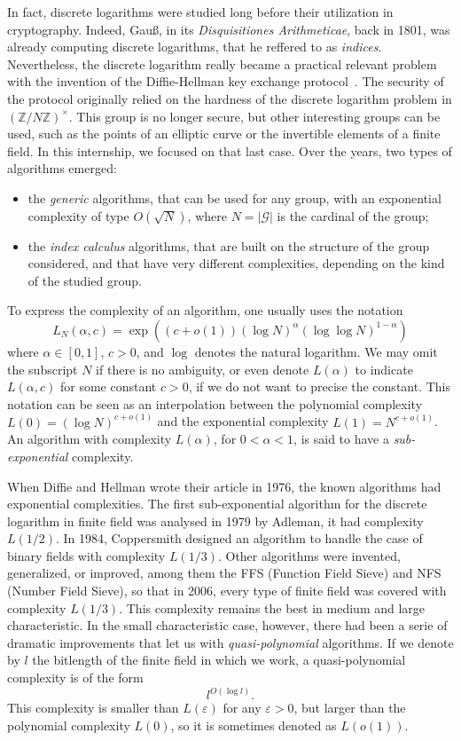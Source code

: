 \documentclass[a4paper,11pt]{article}
\theoremstyle{break}
\theoremstyle{sc}
\theoremstyle{definition}
\theoremstyle{remark}
\begin{document}
In fact, discrete
logarithms were studied long before their utilization in cryptography. Indeed,
Gauß, in its \emph{Disquisitiones Arithmeticae}, back in 1801, was already
computing discrete logarithms, that he reffered to as \emph{indices}.
Nevertheless, the discrete logarithm really became a practical relevant problem
with the invention of the Diffie-Hellman key exchange protocol~\cite{DH76}. The
security of the protocol originally relied on the hardness of the discrete
logarithm problem in $(\mathbb{Z}/N\mathbb{Z})^\times$. This group is no longer
secure, but other interesting groups can be used, such as the points of an
elliptic curve or the invertible elements of a finite field. In this
internship, we focused on that last case. Over the years, two
types of algorithms emerged:
\begin{itemize}
  \item the \emph{generic} algorithms, that can be used for any group, with an
    exponential complexity of type $O(\sqrt N)$, where $N=|\mathcal G|$ is the cardinal
    of the group;
  \item the \emph{index calculus} algorithms, that are built on the structure of
    the group considered, and that have very different complexities, depending
    on the kind of the studied group.
\end{itemize}

To express the complexity of an algorithm, one usually uses the notation
\[
  L_N(\alpha, c) = \exp((c+o(1))(\log N)^\alpha(\log\log N)^{1-\alpha})
\]
where $\alpha\in[0, 1]$, $c>0$, and $\log$ denotes the natural logarithm. We may
omit the subscript $N$ if there is no ambiguity, or even denote
$L(\alpha)$ to indicate $L(\alpha, c)$ for some constant $c>0$, if we do not
want to precise the constant. This notation can be seen as an interpolation
between the polynomial complexity $L(0)=(\log N)^{c+o(1)}$ and the exponential
complexity $L(1)=N^{c+o(1)}$. An algorithm with complexity $L(\alpha)$, for
$0<\alpha<1$, is said to have a \emph{sub-exponential} complexity.

When Diffie and Hellman wrote their article in 1976, the known algorithms
had exponential complexities. The first sub-exponential algorithm for the
discrete logarithm in finite field was analysed
in 1979 by Adleman, it had complexity $L(1/2)$. In 1984, Coppersmith designed
an algorithm to handle the case of binary fields with complexity $L(1/3)$. Other
algorithms were invented, generalized, or improved, among them the FFS
(Function Field Sieve) and NFS (Number Field Sieve), so that in 2006, every type
of finite field was covered with complexity $L(1/3)$. This complexity remains
the best in medium and large characteristic. In the small
characteristic case, however, there had been a serie of dramatic
improvements that let us with \emph{quasi-polynomial} algorithms. If we denote
by $l$ the bitlength of the finite field in which we work, a quasi-polynomial
complexity is of the form
\[
  l^{O(\log l)}.
\]
This complexity is smaller than $L(\varepsilon)$ for any
$\varepsilon>0$, but larger than the polynomial complexity $L(0)$, so it
is sometimes denoted as $L(o(1))$.
\end{document}
